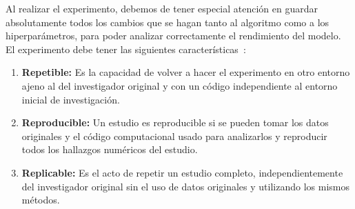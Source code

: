 Al realizar el experimento, debemos de tener especial atención en guardar
absolutamente todos los cambios que se hagan tanto al algoritmo como a los
hiperparámetros, para poder analizar correctamente el rendimiento del modelo. El experimento
debe tener las siguientes características~\cite{Broman2017}:

\begin{enumerate}
    \item{\textbf{Repetible:}} Es la capacidad de volver a hacer el experimento
    en otro entorno ajeno al del investigador original y con un código
    independiente al entorno inicial de investigación.
    \item{\textbf{Reproducible:}} Un estudio es reproducible si se pueden tomar
    los datos originales y el código computacional usado para analizarlos y
    reproducir todos los hallazgos numéricos del estudio.
    \item{\textbf{Replicable:}} Es el acto de repetir un estudio completo,
    independientemente del investigador original sin el uso de datos originales
    y utilizando los mismos métodos.
\end{enumerate}
